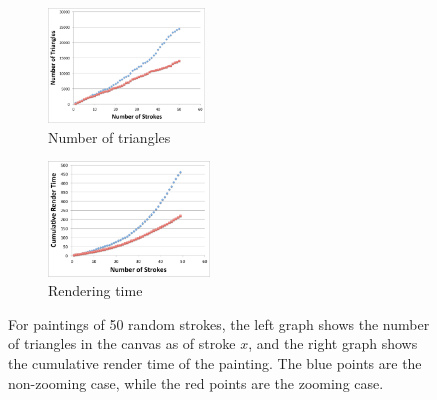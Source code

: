 \documentclass[conference]{acmsiggraph}
\begin{document}
\begin{figure}
  \centering
  \begin{subfigure}[b]{0.5\columnwidth}
    \centering
    \includegraphics[height=1.2in]{graphs/numtriangles}
    \caption{Number of triangles}
    \label{fig:numtriangles}
  \end{subfigure}%
  \begin{subfigure}[b]{0.5\columnwidth}
    \centering
    \includegraphics[height=1.2in]{graphs/cumulativetime}
    \caption{Rendering time}
    \label{fig:timing}
  \end{subfigure}%
  \caption{For paintings of 50 random strokes, the left graph shows the number of triangles in the canvas as of stroke $x$, and the right graph shows the cumulative render time of the painting. The blue points are the non-zooming case, while the red points are the zooming case.}
\end{figure}



\end{document}
